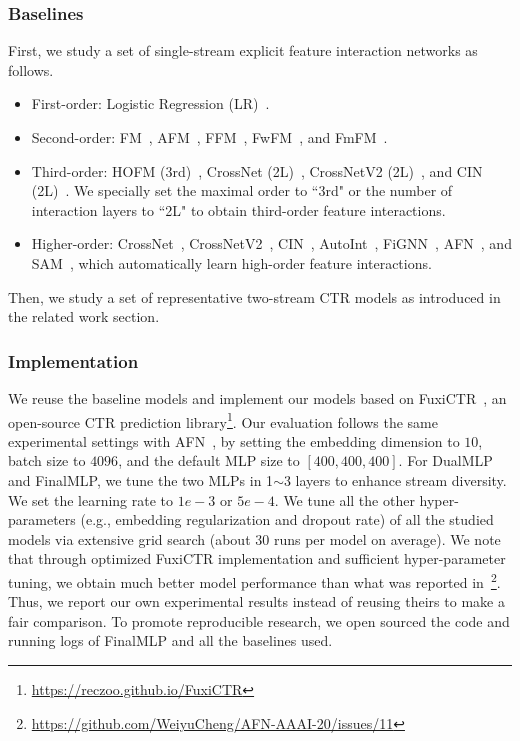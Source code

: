 \documentclass[letterpaper]{article} \usepackage{aaai23}  \usepackage{times}  \usepackage{helvet}  \usepackage{courier}  \usepackage[hyphens]{url}  \usepackage{graphicx} \urlstyle{rm} \def\UrlFont{\rm}  \usepackage{natbib}  \usepackage{caption} \frenchspacing  \setlength{\pdfpagewidth}{8.5in}  \setlength{\pdfpageheight}{11in}  \usepackage{algorithm}
\begin{document}
\subsubsection{Baselines} 
First, we study a set of single-stream explicit feature interaction networks as follows.
\begin{itemize}
    \item First-order: Logistic Regression (LR)~\cite{LR}.
    \item Second-order: FM~\cite{FM}, AFM~\cite{AFM}, FFM~\cite{FFM}, FwFM~\cite{FwFM}, and FmFM~\cite{FmFM}.
    \item Third-order: HOFM (3rd)~\cite{HighFM}, CrossNet (2L)~\cite{DCN}, CrossNetV2 (2L)~\cite{DCN_V2}, and CIN (2L)~\cite{xDeepFM}. We specially set the maximal order to ``3rd" or the number of interaction layers to ``2L" to obtain third-order feature interactions.
    \item Higher-order: CrossNet~\cite{DCN}, CrossNetV2~\cite{DCN_V2}, CIN~\cite{xDeepFM}, AutoInt~\cite{autoint}, FiGNN~\cite{FiGNN}, AFN~\cite{AFN}, and SAM~\cite{SAM}, which automatically learn high-order feature interactions. 
\end{itemize}


Then, we study a set of representative two-stream CTR models as introduced in the related work section.




\subsubsection{Implementation}
We reuse the baseline models and implement our models based on FuxiCTR~\cite{fuxictr}, an open-source CTR prediction library\footnote{\url{https://reczoo.github.io/FuxiCTR}}. Our evaluation follows the same experimental settings with AFN~\cite{AFN}, by setting the embedding dimension to $10$, batch size to $4096$, and the default MLP size to $[400, 400, 400]$. For DualMLP and FinalMLP, we tune the two MLPs in 1$\sim$3 layers to enhance stream diversity. We set the learning rate to $1e-3$ or $5e-4$. We tune all the other hyper-parameters (e.g., embedding regularization and dropout rate) of all the studied models via extensive grid search (about 30 runs per model on average). We note that through optimized FuxiCTR implementation and sufficient hyper-parameter tuning, we obtain much better model performance than what was reported in~\cite{AFN}\footnote{\url{https://github.com/WeiyuCheng/AFN-AAAI-20/issues/11}}. Thus, we report our own experimental results instead of reusing theirs to make a fair comparison. To promote reproducible research, we open sourced the code and running logs of FinalMLP and all the baselines used.
\end{document}
